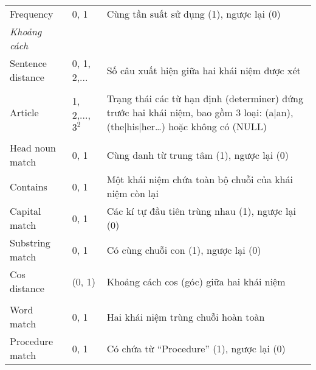 \begin{table}[th]
\begin{tabularx}{\textwidth}{@{}>{\hspace{1em}}P{\raggedright}{0.3}lL@{}}
Frequency & 0, 1 & Cùng tần suất sử dụng (1), ngược lại (0)\\
\textit{Khoảng cách}\\
Sentence distance & 0, 1, 2,... & Số câu xuất hiện giữa hai khái niệm được xét\\
\\
Article & 1, 2,..., $3^{2}$ & Trạng thái các từ hạn định (determiner) đứng trước hai khái niệm, bao gồm 3 loại: (a|an), (the|his|her…) hoặc không có (NULL)\\
\\
Head noun match & 0, 1 & Cùng danh từ trung tâm (1), ngược lại (0)\\
Contains & 0, 1 & Một khái niệm chứa toàn bộ chuỗi của khái niệm còn lại\\
Capital match & 0, 1 & Các kí tự đầu tiên trùng nhau (1), ngược lại (0)\\
Substring match & 0, 1 & Có cùng chuỗi con (1), ngược lại (0)\\
Cos distance & (0, 1) & Khoảng cách cos (góc) giữa hai khái niệm\\
\\
Word match & 0, 1 & Hai khái niệm trùng chuỗi hoàn toàn\\
Procedure match & 0, 1 & Có chứa từ ``Procedure'' (1), ngược lại (0)\\
\bottomrule
\end{tabularx}
\end{table}
